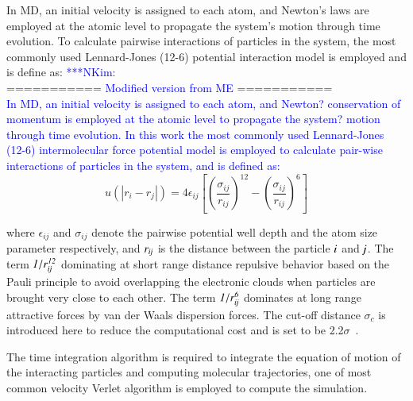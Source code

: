 \documentclass[preprint,12pt]{elsarticle}
\newcommand{\Nkimnote}[1]{ {\textcolor{blue} { ***NKim: #1 }}}
\newcommand{\Nkimnote}[1]{}
\begin{document}


In MD, an initial velocity is assigned to each atom, and Newton's laws are employed at the atomic level to propagate the system's motion through time evolution. To calculate pairwise interactions of particles in the system,  the most commonly used Lennard-Jones (12-6) potential interaction model is employed and is define as:
\Nkimnote{
\\=========== Modified version from ME ===========\\
In MD, an initial velocity is assigned to each atom, and Newton? conservation of momentum is employed at the atomic level to propagate the system? motion through time evolution. In this work the most commonly used Lennard-Jones (12-6) intermolecular force potential model is employed to calculate pair-wise interactions of particles in the system, and is defined as: 
\\}
\vspace{-.2em}
\begin{equation}
 u(|r_{i} - r_{j}|) = 4\epsilon_{ij}[(\frac{\sigma_{ij}}{r_{ij}})^{12}-(\frac{\sigma_{ij}}{r_{ij}})^{6}]
 \label{eq:LJ12}
\end{equation}
\normalsize

where $\epsilon_{ij}$ and $\sigma_{ij}$ denote the pairwise potential well depth and the atom size parameter respectively, and $\it r_{ij}$ is the distance between the particle $\it i$ and $\it j$. The term $\it 1/r_{ij}^{12}$ dominating at short range distance repulsive behavior based on the Pauli principle to avoid overlapping the electronic clouds when particles are  brought very close to each other. The term $\it 1/r_{ij}^6$ dominates at long range attractive forces by van der Waals dispersion forces. The cut-off distance $\sigma_{c}$ is introduced here to reduce the computational cost and is set to be 2.2$\sigma$~\cite{Travis}.

The time integration algorithm is required to integrate the equation of motion of the interacting particles and computing molecular trajectories, one of most common velocity Verlet algorithm is employed to compute the simulation.
\end{document}
